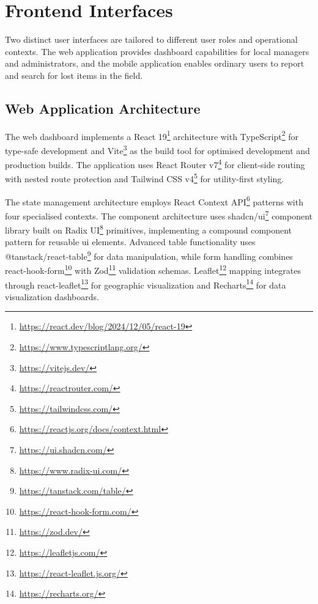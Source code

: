 

\section{Frontend Interfaces} \label{section:frontend_interfaces}

Two distinct user interfaces are tailored to different user roles and operational contexts. The web application provides dashboard capabilities for local managers and administrators, and the mobile application enables ordinary users to report and search for lost items in the field.

\subsection{Web Application Architecture} \label{subsection:web_application}

The web dashboard implements a React 19\footnote{\url{https://react.dev/blog/2024/12/05/react-19}} architecture with TypeScript\footnote{\url{https://www.typescriptlang.org/}} for type-safe development and Vite\footnote{\url{https://vitejs.dev/}} as the build tool for optimised development and production builds. The application uses React Router v7\footnote{\url{https://reactrouter.com/}} for client-side routing with nested route protection and Tailwind CSS v4\footnote{\url{https://tailwindcss.com/}} for utility-first styling.

The state management architecture employs React Context API\footnote{\url{https://reactjs.org/docs/context.html}} patterns with four specialised contexts. The component architecture uses shadcn/ui\footnote{\url{https://ui.shadcn.com/}} component library built on Radix UI\footnote{\url{https://www.radix-ui.com/}} primitives, implementing a compound component pattern for reusable \ac{ui} elements. Advanced table functionality uses @tanstack/react-table\footnote{\url{https://tanstack.com/table/}} for data manipulation, while form handling combines react-hook-form\footnote{\url{https://react-hook-form.com/}} with Zod\footnote{\url{https://zod.dev/}} validation schemas. Leaflet\footnote{\url{https://leafletjs.com/}} mapping integrates through react-leaflet\footnote{\url{https://react-leaflet.js.org/}} for geographic visualization and Recharts\footnote{\url{https://recharts.org/}} for data visualization dashboards.

